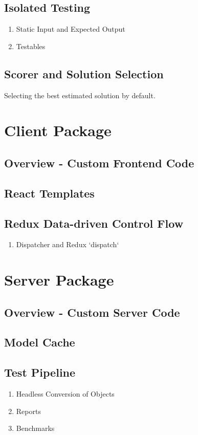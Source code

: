 \documentclass[../ClassicThesis.tex]{subfiles}
\begin{document}
\subsection{Isolated Testing}


\begin{enumerate}
\item Static Input and Expected Output


\item Testables

\end{enumerate}

\subsection{Scorer and Solution Selection}


Selecting the best estimated solution by default.

\section{Client Package}


\subsection{Overview - Custom Frontend Code}


\subsection{React Templates}


\subsection{Redux Data-driven Control Flow}


\begin{enumerate}
\item Dispatcher and Redux `dispatch`

\end{enumerate}

\section{Server Package}


\subsection{Overview - Custom Server Code}


\subsection{Model Cache}


\subsection{Test Pipeline}


\begin{enumerate}
\item Headless Conversion of Objects


\item Reports


\item Benchmarks

\end{enumerate}
\end{document}
